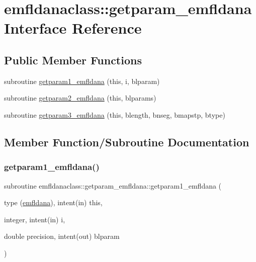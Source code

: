 \hypertarget{interfaceemfldanaclass_1_1getparam__emfldana}{}\section{emfldanaclass\+::getparam\+\_\+emfldana Interface Reference}
\label{interfaceemfldanaclass_1_1getparam__emfldana}
\subsection*{Public Member Functions}
\begin{DoxyCompactItemize}
\item 
subroutine \mbox{\hyperlink{interfaceemfldanaclass_1_1getparam__emfldana_aa739c74d3294d05182fe36368b29997b}{getparam1\+\_\+emfldana}} (this, i, blparam)
\item 
subroutine \mbox{\hyperlink{interfaceemfldanaclass_1_1getparam__emfldana_a24ba6af7abb3d1f169817637b36b69ac}{getparam2\+\_\+emfldana}} (this, blparams)
\item 
subroutine \mbox{\hyperlink{interfaceemfldanaclass_1_1getparam__emfldana_a2ca4b47a02fed29443c167ee8f63e0f2}{getparam3\+\_\+emfldana}} (this, blength, bnseg, bmapstp, btype)
\end{DoxyCompactItemize}


\subsection{Member Function/\+Subroutine Documentation}
\mbox{\label{interfaceemfldanaclass_1_1getparam__emfldana_aa739c74d3294d05182fe36368b29997b}} 
\subsubsection{\texorpdfstring{getparam1\_emfldana()}{getparam1\_emfldana()}}
{\footnotesize\ttfamily subroutine emfldanaclass\+::getparam\+\_\+emfldana\+::getparam1\+\_\+emfldana (\begin{DoxyParamCaption}\item[{type (\mbox{\hyperlink{namespaceemfldanaclass_structemfldanaclass_1_1emfldana}{emfldana}}), intent(in)}]{this,  }\item[{integer, intent(in)}]{i,  }\item[{double precision, intent(out)}]{blparam }\end{DoxyParamCaption})}

